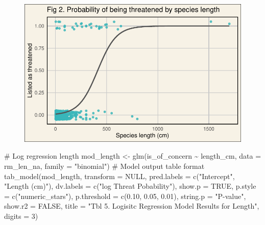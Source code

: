 \documentclass[
  letterpaper,
  DIV=11,
  numbers=noendperiod]{scrartcl}
\newenvironment{Shaded}{\begin{snugshade}}{\end{snugshade}}
\newcommand{\AttributeTok}[1]{\textcolor[rgb]{0.40,0.45,0.13}{#1}}
\newcommand{\CommentTok}[1]{\textcolor[rgb]{0.37,0.37,0.37}{#1}}
\newcommand{\ConstantTok}[1]{\textcolor[rgb]{0.56,0.35,0.01}{#1}}
\newcommand{\DecValTok}[1]{\textcolor[rgb]{0.68,0.00,0.00}{#1}}
\newcommand{\FloatTok}[1]{\textcolor[rgb]{0.68,0.00,0.00}{#1}}
\newcommand{\FunctionTok}[1]{\textcolor[rgb]{0.28,0.35,0.67}{#1}}
\newcommand{\NormalTok}[1]{\textcolor[rgb]{0.00,0.23,0.31}{#1}}
\newcommand{\OtherTok}[1]{\textcolor[rgb]{0.00,0.23,0.31}{#1}}
\newcommand{\SpecialCharTok}[1]{\textcolor[rgb]{0.37,0.37,0.37}{#1}}
\newcommand{\StringTok}[1]{\textcolor[rgb]{0.13,0.47,0.30}{#1}}
\begin{document}
\begin{figure}[H]

{\centering \includegraphics{pdf_files/figure-pdf/unnamed-chunk-8-1.pdf}

}

\end{figure}

\begin{Shaded}
\begin{Highlighting}[]
\CommentTok{\# Log regression length}
\NormalTok{mod\_length }\OtherTok{\textless{}{-}} \FunctionTok{glm}\NormalTok{(is\_of\_concern }\SpecialCharTok{\textasciitilde{}}\NormalTok{ length\_cm, }
                  \AttributeTok{data =}\NormalTok{ rm\_len\_na, }
                  \AttributeTok{family =} \StringTok{"binomial"}\NormalTok{)}
\CommentTok{\# Model output table format}
\FunctionTok{tab\_model}\NormalTok{(mod\_length,}
          \AttributeTok{transform =} \ConstantTok{NULL}\NormalTok{,}
          \AttributeTok{pred.labels =} \FunctionTok{c}\NormalTok{(}\StringTok{"Intercept"}\NormalTok{, }\StringTok{"Length (cm)"}\NormalTok{),}
          \AttributeTok{dv.labels =} \FunctionTok{c}\NormalTok{(}\StringTok{"log Threat Pobability"}\NormalTok{),}
          \AttributeTok{show.p =} \ConstantTok{TRUE}\NormalTok{,}
          \AttributeTok{p.style =} \FunctionTok{c}\NormalTok{(}\StringTok{"numeric\_stars"}\NormalTok{),}
          \AttributeTok{p.threshold =} \FunctionTok{c}\NormalTok{(}\FloatTok{0.10}\NormalTok{, }\FloatTok{0.05}\NormalTok{, }\FloatTok{0.01}\NormalTok{),}
          \AttributeTok{string.p =} \StringTok{"P{-}value"}\NormalTok{,}
          \AttributeTok{show.r2 =} \ConstantTok{FALSE}\NormalTok{,}
          \AttributeTok{title =} \StringTok{"Tbl 5. Logisitc Regression Model Results for Length"}\NormalTok{,}
          \AttributeTok{digits =} \DecValTok{3}\NormalTok{)}
\end{Highlighting}
\end{Shaded}
\end{document}
